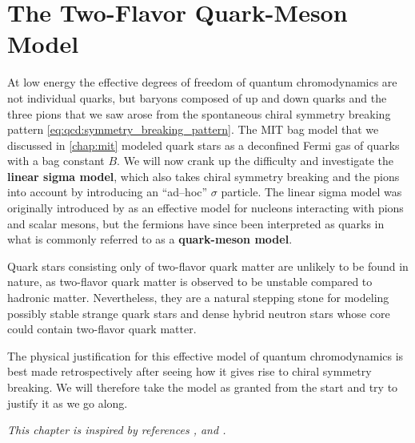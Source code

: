 \chapter{The Two-Flavor Quark-Meson Model}
\label{chap:lsm2f}

At low energy the effective degrees of freedom of quantum chromodynamics are not individual quarks,
but baryons composed of up and down quarks and the three pions that we saw arose from the spontaneous chiral symmetry breaking pattern \eqref{eq:qcd:symmetry_breaking_pattern}.
The MIT bag model that we discussed in \cref{chap:mit} modeled quark stars as a deconfined Fermi gas of quarks with a bag constant $B$.
We will now crank up the difficulty and investigate the \textbf{linear sigma model}, which also takes chiral symmetry breaking and the pions into account by introducing an ``ad--hoc'' $\sigma$ particle.
The linear sigma model was originally introduced by \cite{ref:lsm_original} as an effective model for nucleons interacting with pions and scalar mesons,
but the fermions have since been interpreted as quarks in what is commonly referred to as a \textbf{quark-meson model}.

Quark stars consisting only of two-flavor quark matter are unlikely to be found in nature,
as two-flavor quark matter is observed to be unstable compared to hadronic matter.
Nevertheless, they are a natural stepping stone for modeling possibly stable strange quark stars
and dense hybrid neutron stars whose core could contain two-flavor quark matter.

The physical justification for this effective model of quantum chromodynamics is best made retrospectively after seeing how it gives rise to chiral symmetry breaking.
We will therefore take the model as granted from the start and try to justify it as we go along.

\textit{This chapter is inspired by references \cite{ref:lsm_2f}, \cite{ref:lsm_notes} and \cite{ref:jo_lsm_consistent_physical}.}

